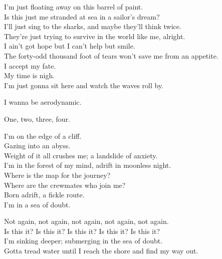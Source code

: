 
I'm just floating away on this barrel of paint. \\
Is this just me stranded at sea in a sailor's dream? \\
I'll just sing to the sharks, and maybe they'll think twice. \\
They're just trying to survive in the world like me, alright. \\
I ain't got hope but I can't help but smile. \\
The forty-odd thousand foot of tears won't save me from an appetite. \\
I accept my fate. \\
My time is nigh. \\
I'm just gonna sit here and watch the waves roll by. \\


I wanna be aerodynamic. \\




One, two, three, four. \\


I'm on the edge of a cliff. \\
Gazing into an abyss. \\
Weight of it all crushes me; a landslide of anxiety. \\
I'm in the forest of my mind, adrift in moonless night. \\
Where is the map for the journey? \\
Where are the crewmates who join me? \\
Born adrift, a fickle route. \\
I'm in a sea of doubt. \\


Not again, not again, not again, not again, not again. \\
Is this it? Is this it? Is this it? Is this it? Is this it? \\
I'm sinking deeper; submerging in the sea of doubt. \\
Gotta tread water until I reach the shore and find my way out. \\

